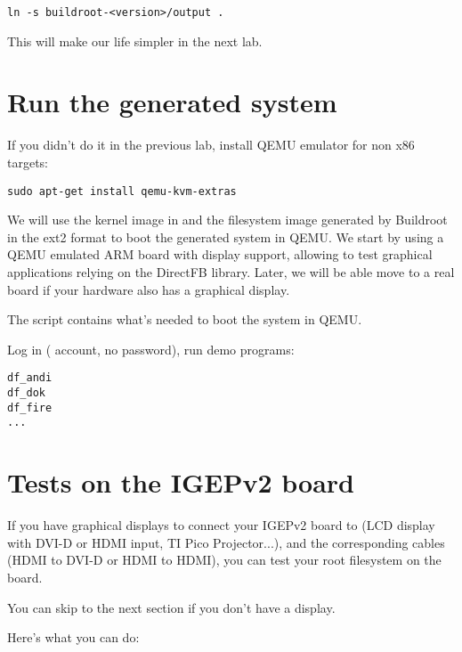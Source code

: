 \begin{verbatim}
ln -s buildroot-<version>/output .
\end{verbatim}

This will make our life simpler in the next lab.

\section{Run the generated system}

If you didn't do it in the previous lab, install QEMU emulator for non
x86 targets:

\begin{verbatim}
sudo apt-get install qemu-kvm-extras
\end{verbatim}

We will use the kernel image in  and the filesystem image
generated by Buildroot in the ext2 format to boot the generated system
in QEMU. We start by using a QEMU emulated ARM board with display
support, allowing to test graphical applications relying on the
DirectFB library. Later, we will be able move to a real board if your
hardware also has a graphical display.

The  script contains what's needed to boot the system
in QEMU.

Log in ( account, no password), run demo programs:

\begin{verbatim}
df_andi
df_dok
df_fire
...
\end{verbatim}

\section{Tests on the IGEPv2 board}

If you have graphical displays to connect your IGEPv2 board to (LCD
display with DVI-D or HDMI input, TI Pico Projector...), and the
corresponding cables (HDMI to DVI-D or HDMI to HDMI), you can test
your root filesystem on the board.

You can skip to the next section if you don't have a display.

Here's what you can do:

